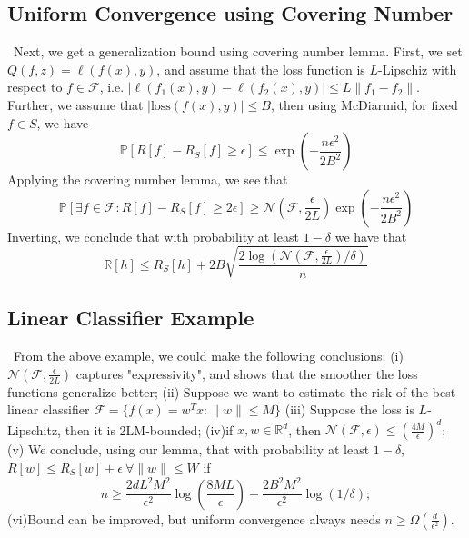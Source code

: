 \documentclass{article}[12pt]
\begin{document}
\subsection{Uniform Convergence using Covering Number}
\
\indent Next, we get a generalization bound using covering number lemma. First, we set $Q(f,z)=\ell(f(x),y)$, and assume that the loss function is $L$-Lipschiz with respect to $f \in \mathcal{F}$, i.e. $|\ell(f_1(x),y)-\ell(f_2(x),y)| \leq L \|f_1 - f_2\|$. Further, we assume that $|\text{loss}(f(x),y)| \leq B$, then using McDiarmid, for fixed $f \in S$, we have
\begin{equation}
    \mathbb{P}[R[f]-R_S[f]\geq \epsilon] \leq \exp{(-\frac{n\epsilon^2}{2B^2})}
\end{equation}Applying the covering number lemma, we see that 
\begin{equation}
    \mathbb{P}[\exists f \in \mathcal{F}: R[f]-R_S[f]\geq 2\epsilon] \geq \mathcal{N}(\mathcal{F}, \frac{\epsilon}{2L}) \exp{(-\frac{n\epsilon^2}{2B^2})}
\end{equation}
Inverting, we conclude that with probability at least $1-\delta$ we have that 
\begin{equation}
    \mathbb{R}[h] \leq R_S[h] + 2B\sqrt{\frac{2\log(\mathcal{N}(\mathcal{F}, \frac{\epsilon}{2L})/\delta)}{n}}
\end{equation}

\subsection{Linear Classifier Example}
\
\indent From the above example, we could make the following conclusions: (i) $\mathcal{N}(\mathcal{F},\frac{\epsilon}{2L})$ captures "expressivity", and shows that the smoother the loss functions generalize better; (ii) Suppose we want to estimate the risk of the best linear classifier $\mathcal{F} = \{f(x)=w^Tx: \|w\|\leq M\}$ (iii) Suppose the loss is $L$-Lipschitz, then it is 2LM-bounded; (iv)if $x, w \in \mathbb{R}^d$, then $\mathcal{N}(\mathcal{F}, \epsilon)\leq (\frac{4M}{\epsilon})^d$; (v) We conclude, using our lemma, that with probability at least $1-\delta$, $R[w]\leq R_S[w]+\epsilon \ \forall \|w\| \leq W$ if 
    \begin{equation*}
        n \geq \frac{2dL^2M^2}{\epsilon^2} \log (\frac{8ML}{\epsilon}) + \frac{2B^2M^2}{\epsilon^2}\log(1/\delta);
    \end{equation*} (vi)Bound can be improved, but uniform convergence always needs $n\geq \Omega(\frac{d}{\epsilon^2})$.




 
\end{document}
